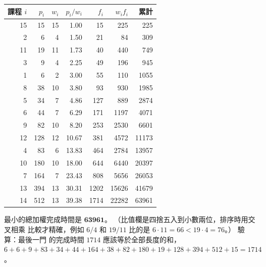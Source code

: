 \begin{center}
\small
\begin{tabular}{rrrrrrr}
\toprule
課程 $i$ & $p_i$ & $w_i$ & $p_i / w_i$ & $f_i$ & $w_i f_i$ & 累計 \\
\midrule
15 & 15 & 15 & 1.00 & 15 & 225 & 225 \\
2 & 6 & 4 & 1.50 & 21 & 84 & 309 \\
11 & 19 & 11 & 1.73 & 40 & 440 & 749 \\
3 & 9 & 4 & 2.25 & 49 & 196 & 945 \\
1 & 6 & 2 & 3.00 & 55 & 110 & 1055 \\
8 & 38 & 10 & 3.80 & 93 & 930 & 1985 \\
5 & 34 & 7 & 4.86 & 127 & 889 & 2874 \\
6 & 44 & 7 & 6.29 & 171 & 1197 & 4071 \\
9 & 82 & 10 & 8.20 & 253 & 2530 & 6601 \\
12 & 128 & 12 & 10.67 & 381 & 4572 & 11173 \\
4 & 83 & 6 & 13.83 & 464 & 2784 & 13957 \\
10 & 180 & 10 & 18.00 & 644 & 6440 & 20397 \\
7 & 164 & 7 & 23.43 & 808 & 5656 & 26053 \\
13 & 394 & 13 & 30.31 & 1202 & 15626 & 41679 \\
14 & 512 & 13 & 39.38 & 1714 & 22282 & 63961 \\
\bottomrule
\end{tabular}
\end{center}

最小的總加權完成時間是 $\mathbf{63961}$。 （比值欄是四捨五入到小數兩位，排序時用交叉相乘
比較才精確，例如 $6/4$ 和 $19/11$ 比的是 $6 \cdot 11 = 66 < 19 \cdot 4 = 76$。） 驗算：最後一門
的完成時間 $1714$ 應該等於全部長度的和，$6 + 6 + 9 + 83 + 34 + 44 + 164 + 38 + 82 + 180 + 19 +
128 + 394 + 512 + 15 = 1714$。
